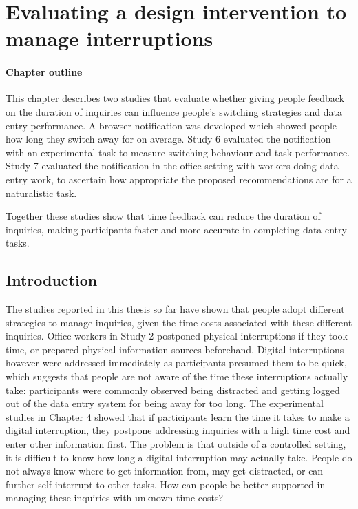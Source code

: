 \chapter{Evaluating a design intervention to manage interruptions}\label{ch:ch56}
\begin{mynote}
\subsubsection{Chapter outline}
This chapter describes two studies that evaluate whether giving people feedback on the duration of inquiries can influence people's switching strategies and data entry performance. A browser notification was developed which showed people how long they switch away for on average. Study 6 evaluated the notification with an experimental task to measure switching behaviour and task performance. Study 7 evaluated the notification in the office setting with workers doing data entry work, to ascertain how appropriate the proposed recommendations are for a naturalistic task.

Together these studies show that time feedback can reduce the duration of inquiries, making participants faster and more accurate in completing data entry tasks.  
\end{mynote}

\section{Introduction}
The studies reported in this thesis so far have shown that people adopt different strategies to manage inquiries, given the time costs associated with these different inquiries. Office workers in Study 2 postponed physical interruptions if they took time, or prepared physical information sources beforehand. Digital interruptions however were addressed immediately as participants presumed them to be quick, which suggests that people are not aware of the time these interruptions actually take: participants were commonly observed being distracted and getting logged out of the data entry system for being away for too long. The experimental studies in Chapter 4 showed that if participants learn the time it takes to make a digital interruption, they postpone addressing inquiries with a high time cost and enter other information first. The problem is that outside of a controlled setting, it is difficult to know how long a digital interruption may actually take. People do not always know where to get information from, may get distracted, or can further self-interrupt to other tasks. How can people be better supported in managing these inquiries with unknown time costs?

